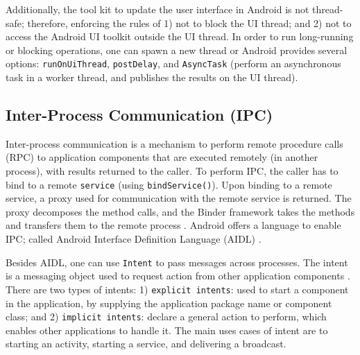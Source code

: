 Additionally, the tool kit to update the user interface in Android is not thread-safe; therefore, enforcing the rules of 1) not to block the UI thread; and 2) not to access the Android UI toolkit outside the UI thread. In order to run long-running or blocking operations, one can spawn a new thread or Android provides several options: \verb|runOnUiThread|, \verb|postDelay|, and \verb|AsyncTask| (perform an asynchronous task in a worker thread, and publishes the results on the UI thread). 

\subsection{Inter-Process Communication (IPC)}
Inter-process communication is a mechanism to perform remote procedure calls (RPC) to application components that are executed remotely (in another process), with results returned to the caller. To perform IPC, the caller has to bind to a remote \verb|service| (using \verb|bindService()|). Upon binding to a remote service, a proxy used for communication with the remote service is returned. The proxy decomposes the method calls, and the Binder framework takes the methods and transfers them to the remote process \cite{binder}. Android offers a language to enable IPC; called Android Interface Definition Language (AIDL) \cite{aidl}. 

Besides AIDL, one can use \verb|Intent| to pass messages across processes. The intent is a messaging object used to request action from other application components \cite{intents}. There are two types of intents: 1) \verb|explicit intents|: used to start a component in the application, by supplying the application package name or component class; and 2) \verb|implicit intents|: declare a general action to perform, which enables other applications to handle it. The main uses cases of intent are to starting an activity, starting a service, and delivering a broadcast.  

